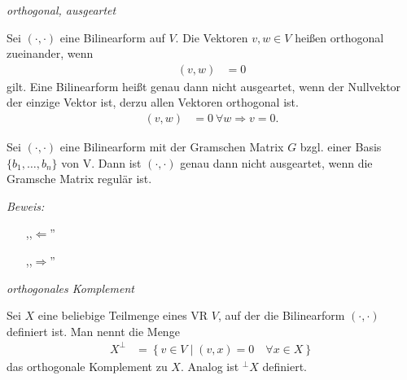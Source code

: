 \begin{mydef} \label{orthogonal,ausgeartet} \textit{orthogonal, ausgeartet}

    Sei $(\cdot , \cdot )$ eine Bilinearform auf $V$.
    Die Vektoren $v,w\in V$ heißen orthogonal zueinander, wenn 
    \begin{align*}
            (v,w) & = 0
    \end{align*}
    gilt.
    Eine Bilinearform heißt genau dann nicht ausgeartet, wenn der Nullvektor der einzige Vektor ist, derzu allen Vektoren orthogonal ist.
    \begin{align*}
            (v,w) & = 0 \ \forall w \Rightarrow v = 0.
    \end{align*}
\end{mydef}


\begin{mylemma}

    Sei $(\cdot , \cdot )$ eine Bilinearform mit der Gramschen Matrix $G$ bzgl. einer Basis $\{ b_1, \ldots, b_n \}$ von V.
    Dann ist $(\cdot , \cdot)$ genau dann nicht ausgeartet, wenn die Gramsche Matrix regulär ist.\par\medskip

    \textit{Beweis:}
    \begin{itemize}
        \item[,,$\Leftarrow$'']
        \item[,,$\Rightarrow$'']
    \end{itemize}
\end{mylemma}


\begin{mydef} \label{orthogonalesKomplemen} \textit{orthogonales Komplement}

        Sei $X$ eine beliebige Teilmenge eines VR $V$, auf der die Bilinearform $(\cdot , \cdot)$ definiert ist.
        Man nennt die Menge
        \begin{align*}
                X^{\perp} & = \left\{ v \in V \mid (v,x) = 0 \quad \forall x \in X \right\}
        \end{align*}
        das orthogonale Komplement zu $X$. 
        Analog ist $^{\perp}X$ definiert.
\end{mydef}

